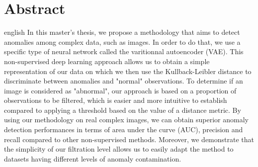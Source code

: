 \chapter*{Abstract}             %
\label{chap:abstract}           %

\begin{otherlanguage*}{english}
In this master's thesis, we propose a methodology that aims to detect anomalies among complex data, such as images. In order to do that, we use a specific type of neural network called the varitionnal autoencoder (VAE). This non-supervised deep learning approach allows us to obtain a simple representation of our data on which we then use the Kullback-Leibler distance to discriminate between anomalies and "normal" observations. To determine if an image is considered as "abnormal", our approach is based on a proportion of observations to be filtered, which is easier and more intuitive to establish compared to applying a threshold based on the value of a distance metric. By using our methodology on real complex images, we can obtain superior anomaly detection performances in terms of area under the curve (AUC), precision and recall compared to other non-supervised methods. Moreover, we demonstrate that the simplicity of our filtration level allows us to easily adapt the method to datasets having different levels of anomaly contamination.
\end{otherlanguage*}